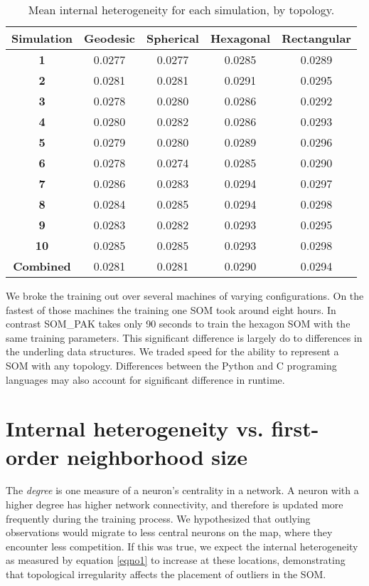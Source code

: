 \begin{table}[hbt]
\centering
\caption{Mean internal heterogeneity for each simulation, by topology.}
\label{ivtable3}
\begin{tabular}{|c||c|c|c|c|}
\hline
\textbf{Simulation} & Geodesic & Spherical & Hexagonal & Rectangular \\
\hline
\hline
\textbf{1} & 0.0277 & 0.0277 & 0.0285 & 0.0289 \\
\textbf{2} & 0.0281 & 0.0281 & 0.0291 & 0.0295 \\
\textbf{3} & 0.0278 & 0.0280 & 0.0286 & 0.0292 \\
\textbf{4} & 0.0280 & 0.0282 & 0.0286 & 0.0293 \\
\textbf{5} & 0.0279 & 0.0280 & 0.0289 & 0.0296 \\
\textbf{6} & 0.0278 & 0.0274 & 0.0285 & 0.0290 \\
\textbf{7} & 0.0286 & 0.0283 & 0.0294 & 0.0297 \\
\textbf{8} & 0.0284 & 0.0285 & 0.0294 & 0.0298 \\
\textbf{9} & 0.0283 & 0.0282 & 0.0293 & 0.0295 \\
\textbf{10}& 0.0285 & 0.0285 & 0.0293 & 0.0298 \\
\hline
\hline
\textbf{Combined} & 0.0281 & 0.0281 & 0.0290 & 0.0294\\
\hline
\end{tabular} \end{table}

We broke the training out over several machines of varying configurations.
On the fastest of those machines the training one SOM took around eight
hours.  In contrast SOM\_PAK takes only 90 seconds to train the hexagon SOM
with the same training parameters.  This significant difference is largely do
to differences in the underling data structures.  We traded speed for the
ability to represent a SOM with any topology.  Differences between the Python
and C programing languages may also account for significant difference in
runtime.


\section{Internal heterogeneity vs. first-order neighborhood size}
\label{rdq1}
The \emph{degree} is one measure of a neuron's centrality in a network. A
neuron with a higher degree has higher network connectivity, and therefore is
updated more frequently during the training process.  We hypothesized that
outlying observations would migrate to less central neurons on the map, where
they encounter less competition.  If this was true, we expect the internal heterogeneity
as measured by equation \ref{eqno1} to increase at these locations,
demonstrating that topological irregularity affects the placement of outliers
in the SOM.  

